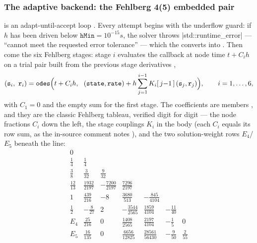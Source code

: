 \subsubsection{The adaptive backend: the Fehlberg 4(5) embedded pair}\label{sec:simcore-rkf45}

 is an adapt-until-accept loop . Every attempt
begins with the underflow guard: if $h$ has been driven below $\mathtt{hMin}=10^{-15}\unit{s}$,
the solver throws \cppinline|std::runtime_error| --- ``cannot meet the requested error
tolerance''  --- which the  converts into
. Then come the six Fehlberg stages: stage $i$ evaluates the callback at
node time $t + C_i h$ on a trial pair built from the previous stage derivatives
,
\begin{equation}\label{eq:simcore-stages}
(\mathtt{s}_i,\ \mathtt{r}_i)
 = \mathtt{odes}\Bigl(t + C_i h,\ \ (\mathtt{state},\mathtt{rate})
 + h \sum_{j=1}^{i-1} K_i[\,j{-}1\,]\,(\mathtt{s}_j,\mathtt{r}_j)\Bigr),
\qquad i = 1,\dots,6,
\end{equation}
with $C_1=0$ and the empty sum for the first stage. The coefficients are 
members , and they are the classic Fehlberg tableau, verified
digit for digit --- the node fractions $C_i$ down the left, the stage couplings $K_i$ in the
body (each $C_i$ equals its row sum, as the in-source comment notes
), and the two solution-weight rows $E_4$/$E_5$ beneath the line:
{\renewcommand{\arraystretch}{1.6}%
\begin{equation}\label{eq:simcore-tableau}
\begin{array}{c|cccccc}
0 & & & & & & \\
\tfrac{1}{4} & \tfrac{1}{4} & & & & & \\
\tfrac{3}{8} & \tfrac{3}{32} & \tfrac{9}{32} & & & & \\
\tfrac{12}{13} & \tfrac{1932}{2197} & -\tfrac{7200}{2197} & \tfrac{7296}{2197} & & & \\
1 & \tfrac{439}{216} & -8 & \tfrac{3680}{513} & -\tfrac{845}{4104} & & \\
\tfrac{1}{2} & -\tfrac{8}{27} & 2 & -\tfrac{3544}{2565} & \tfrac{1859}{4104} & -\tfrac{11}{40} & \\
\hline
E_4 & \tfrac{25}{216} & 0 & \tfrac{1408}{2565} & \tfrac{2197}{4104} & -\tfrac{1}{5} & 0 \\
E_5 & \tfrac{16}{135} & 0 & \tfrac{6656}{12825} & \tfrac{28561}{56430} & -\tfrac{9}{50} & \tfrac{2}{55}
\end{array}
\end{equation}}%

